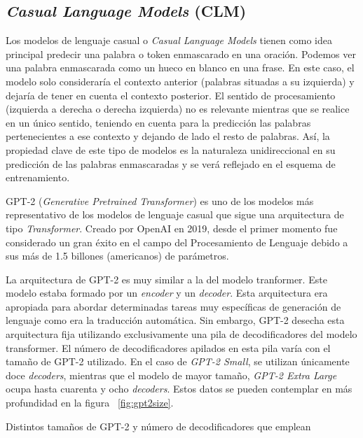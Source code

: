 \subsection{\textit{Casual Language Models} (CLM)}

Los modelos de lenguaje casual o \textit{Casual Language Models} tienen como idea principal predecir una palabra o token enmascarado en una oración. Podemos ver una palabra enmascarada como un hueco en blanco en una frase. En este caso, el modelo solo consideraría el contexto anterior (palabras situadas a su izquierda) y dejaría de tener en cuenta el contexto posterior. El sentido de procesamiento (izquierda a derecha o derecha izquierda) no es relevante mientras que se realice en un único sentido, teniendo en cuenta para la predicción las palabras pertenecientes a ese contexto y dejando de lado el resto de palabras. Así, la propiedad clave de este tipo de modelos es la naturaleza unidireccional en su predicción de las palabras enmascaradas y se verá reflejado en el esquema de entrenamiento.

GPT-2 (\textit{Generative Pretrained Transformer}) es uno de los modelos más representativo de los modelos de lenguaje casual que sigue una arquitectura de tipo \textit{Transformer}. Creado por OpenAI en 2019, desde el primer momento fue considerado un gran éxito en el campo del Procesamiento de Lenguaje debido a sus más de 1.5 billones (americanos) de parámetros.

La arquitectura de GPT-2 es muy similar a la del modelo tranformer. Este modelo estaba formado por un \textit{encoder} y un \textit{decoder}. Esta arquitectura era apropiada para abordar determinadas tareas muy específicas de generación de lenguaje como era la traducción automática. Sin embargo, GPT-2 desecha esta arquitectura fija utilizando exclusivamente una pila de decodificadores del modelo transformer. El número de decodificadores apilados en esta pila varía con el tamaño de GPT-2 utilizado. En el caso de \textit{GPT-2 Small}, se utilizan únicamente doce \textit{decoders}, mientras que el modelo de mayor tamaño, \textit{GPT-2 Extra Large} ocupa hasta cuarenta y ocho \textit{decoders}. Estos datos se pueden contemplar en más profundidad en la figura ~\ref{fig:gpt2size}.



%
{Distintos tamaños de GPT-2 y número de decodificadores que emplean}

